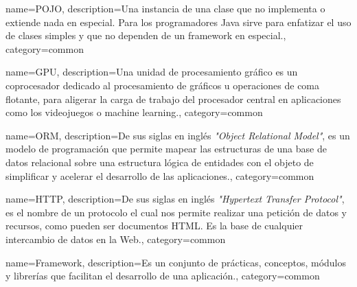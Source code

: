 {
    name=POJO,
    description={Una instancia de una clase que no implementa o extiende nada en especial. Para los programadores Java sirve para enfatizar el uso de clases simples y que no dependen de un framework en especial.},
    category={common}
}

{
    name=GPU,
    description={Una unidad de procesamiento gráfico es un coprocesador dedicado al procesamiento de gráficos u operaciones de coma flotante, para aligerar la carga de trabajo del procesador central en aplicaciones como los videojuegos o machine learning.},
    category={common}
}

{
    name=ORM,
    description={De sus siglas en inglés \textit{"Object Relational Model"}, es un modelo de programación que permite mapear las estructuras de una base de datos relacional sobre una estructura lógica de entidades con el objeto de simplificar y acelerar el desarrollo de las aplicaciones.},
    category={common}
}

{
    name=HTTP,
    description={De sus siglas en inglés \textit{"Hypertext Transfer Protocol"}, es el nombre de un protocolo el cual nos permite realizar una petición de datos y recursos, como pueden ser documentos HTML. Es la base de cualquier intercambio de datos en la Web.},
    category={common}
}

{
    name=Framework,
    description={Es un conjunto de prácticas, conceptos, módulos y librerías que facilitan el desarrollo de una aplicación.},
    category={common}
}
